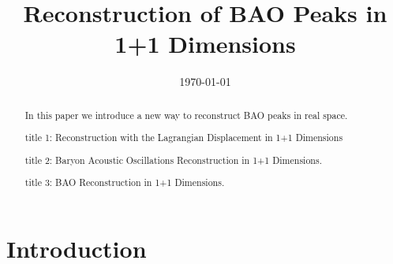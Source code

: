 \documentclass[aps,prd,twocolumn,showpacs,superscriptaddress,groupedaddress,nofootinbib]{revtex4}  %
\begin{document}
\widetext

\title{Reconstruction of BAO Peaks in 1+1 Dimensions}

%
%


\date{\today}

\begin{abstract}
In this paper we introduce a new way to reconstruct BAO peaks in real space.

title 1: Reconstruction with the Lagrangian Displacement in 1+1 Dimensions

title 2: Baryon Acoustic Oscillations Reconstruction in 1+1 Dimensions.

title 3: BAO Reconstruction in 1+1 Dimensions.
\end{abstract}

\pacs{}
\maketitle


\section{Introduction}
\end{document}
